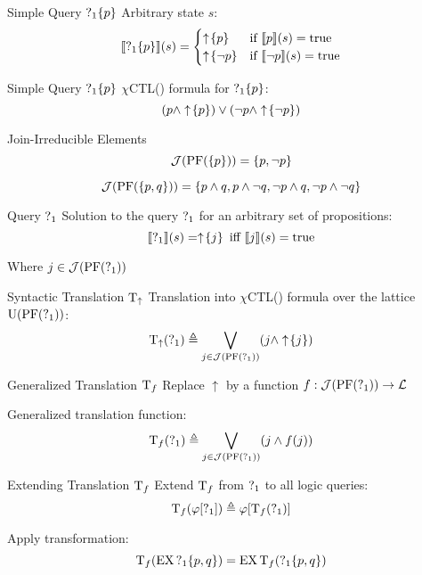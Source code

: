 \begin{frame}{Simple Query $\operatorname{?}_1\{p\}$}
  Arbitrary state $s$:
  \[ \llbracket \operatorname{?}_1\{p\} \rrbracket (s) = \begin{cases}
       \uparrow \! \left\{ p \right\} & \text{if } \llbracket p \rrbracket (s) = \operatorname{true} \\
       \uparrow \! \left\{ \lnot p \right\} & \text{if } \llbracket \lnot p \rrbracket (s) = \operatorname{true}
     \end{cases} 
  \]
\end{frame}

\begin{frame}{Simple Query $\operatorname{?}_1\{p\}$}
  $\chi$CTL(\mcL) formula for $\operatorname{?}_1\{p\}$:
  \[ (p \land \uparrow \! \left\{ p \right\}) \lor (\lnot p \land \uparrow \! \left\{ \lnot p \right\}) \]
\end{frame}

\begin{frame}{Join-Irreducible Elements}
  \[ 
    \mathcal{J}(\operatorname{PF}(\{p\})) = \{ p, \lnot p \} 
  \]
  
  \[ 
    \mathcal{J}(\operatorname{PF}(\{p,q\})) = \{ p \land q, p \land \lnot q, 
                            \lnot p \land q, \lnot p \land \lnot q \} 
  \]
\end{frame}

\begin{frame}{Query $\operatorname{?}_1$}
  Solution to the query $\operatorname{?}_1$ for an arbitrary set of propositions:
  \[ \llbracket \operatorname{?}_1 \rrbracket (s) = \uparrow \! \left\{ j \right\} \text{ iff } \llbracket j \rrbracket (s) = \operatorname{true}
  \]
  
  Where $j\in\mathcal{J}(\operatorname{PF}(\operatorname{?}_1))$
\end{frame}

\begin{frame}{Syntactic Translation $\operatorname{T}_\uparrow$}
  Translation into $\chi$CTL(\mcL) formula over the lattice $\operatorname{U}(\operatorname{PF}(\operatorname{?}_1))$:
  \[ 
    \operatorname{T}_\uparrow(\operatorname{?}_1) \triangleq \bigvee_{j\in\mathcal{J}(\operatorname{PF}(\operatorname{?}_1))} (j \land \uparrow \! \left\{ j \right\})
  \]
\end{frame}

\begin{frame}{Generalized Translation $\operatorname{T}_f$}
  Replace $\uparrow$ by a function $f : \mathcal{J}(\operatorname{PF}(\operatorname{?}_1)) \to \mathcal{L}$

  Generalized translation function:
  \[ 
    \operatorname{T}_f(\operatorname{?}_1) \triangleq \bigvee_{j\in\mathcal{J}(\operatorname{PF}(\operatorname{?}_1))} (j \land f(j))
  \]
\end{frame}

\begin{frame}{Extending Translation $\operatorname{T}_f$}
  Extend $\operatorname{T}_f$ from $\operatorname{?}_1$ to all logic queries:
  \[ 
    \operatorname{T}_f(\varphi[\operatorname{?}_1]) \triangleq \varphi[\operatorname{T}_f(\operatorname{?}_1)]
  \]
  
  \begin{example}
    Apply transformation:
    \[ \operatorname{T}_f(\operatorname{EX} \operatorname{?}_1\{p,q\}) = \operatorname{EX}\operatorname{T}_f( \operatorname{?}_1\{p,q\}) \]
  \end{example}
\end{frame}

